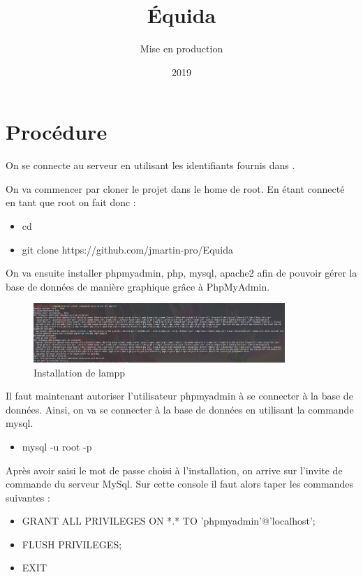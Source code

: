 \documentclass[report]{BetterDocument}
\title{Équida}
\subtitle{Mise en production}
\date{2019}
\newcommand{\bdd}{base de données}
\begin{document}
	\pageDeGarde

	\chapter{Procédure}

		On se connecte au serveur en utilisant les identifiants fournis dans .

		On va commencer par cloner le projet dans le home de root. En étant connecté en tant que root on fait donc :

		\begin{itemize}
			\item{cd}
			\item{git clone https://github.com/jmartin-pro/Equida}
		\end{itemize}

		On va ensuite installer phpmyadmin, php, mysql, apache2 afin de pouvoir gérer la base de données de manière graphique grâce à PhpMyAdmin.

		\begin{figure}[H]
			\centering\includegraphics[width=0.85\textwidth, keepaspectratio]{res/install-lampp.png}
			\caption{Installation de lampp}
		\end{figure}

		Il faut maintenant autoriser l'utilisateur phpmyadmin à se connecter à la \bdd{}. Ainsi, on va se connecter à la \bdd{} en utilisant la commande mysql.

		\begin{itemize}
			\item{mysql -u root -p}
		\end{itemize}

		Après avoir saisi le mot de passe choisi à l'installation, on arrive sur l'invite de commande du serveur MySql. Sur cette console il faut alors taper les commandes suivantes :

		\begin{itemize}
			\item{GRANT ALL PRIVILEGES ON *.* TO 'phpmyadmin'@'localhost';}
			\item{FLUSH PRIVILEGES;}
			\item{EXIT}
		\end{itemize}
\end{document}
